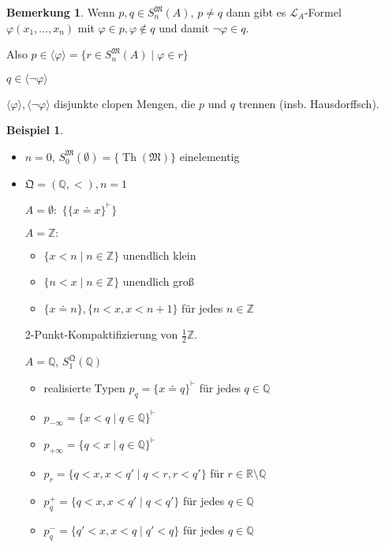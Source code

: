 \documentclass[12pt,parskip=full]{scrartcl}
\newcommand{\setZ}{\mathbb{Z}}
\newcommand{\setQ}{\mathbb{Q}}
\newcommand{\setR}{\mathbb{R}}
\theoremstyle{definition}
\newtheorem{example}[theorem]{Beispiel}
\newtheorem{remark}[theorem]{Bemerkung}
\begin{document}
 	\begin{remark}
 		Wenn $p,q \in S_n^\mathfrak{M}(A)$, $p \neq q$ dann gibt es $\mathcal{L}_A$-Formel $\varphi(x_1, \dots, x_n)$ mit $\varphi \in p, \varphi \notin q$ und damit $\lnot \varphi \in q$.
 		
 		Also $p \in \langle \varphi \rangle = \{ r \in S_n^\mathfrak{M}(A) \mid \varphi \in r \}$
 		
 		$q \in \langle \lnot \varphi \rangle$
 		
 		$\langle \varphi \rangle, \langle \lnot \varphi \rangle$ disjunkte clopen Mengen, die $p$ und $q$ trennen (insb. Hausdorffsch).
 	\end{remark}
 
 	\begin{example}
 		\begin{itemize}
 			\item $n = 0$, $S_0^\mathfrak{M}(\emptyset)= \{ \operatorname{Th}(\mathfrak{M}) \}$ einelementig
 			\item $\mathfrak{Q} = (\setQ, <), n = 1$
 			
 			$A = \emptyset:$ $\{ \{ x \doteq x \}^\vdash \}$
 			
 			$A = \setZ:$ 
 			\begin{itemize}
 				\item $\{ x < n \mid n \in \setZ \}$ unendlich klein
 				\item $\{ n < x \mid n \in \setZ \}$ unendlich groß
 				\item $\{ x \doteq n \}, \{ n < x, x < n + 1 \}$ für jedes $n \in \setZ$
 			\end{itemize}
 			2-Punkt-Kompaktifizierung von $\frac12 \setZ$.
 			
 			$A = \setQ$, $S_1^\mathfrak{Q}(\setQ)$
 			\begin{itemize}
 				\item realisierte Typen $p_q = \{ x \doteq q \}^\vdash$ für jedes $q \in \setQ$
 				\item $p_{-\infty} = \{ x < q \mid q \in \setQ \}^\vdash$
 				\item $p_{+\infty} = \{ q < x \mid q \in \setQ \}^\vdash$
 				\item $p_r = \{ q < x, x < q' \mid q < r, r < q' \}$ für $r \in \setR \setminus \setQ$
 				\item $p_q^+ = \{ q < x, x < q' \mid q < q' \}$ für jedes $q \in \setQ$
 				\item $p_q^- = \{ q' < x, x < q \mid q' < q \}$ für jedes $q \in \setQ$
 			\end{itemize}
 		\end{itemize}
 	\end{example}
 
\end{document}
